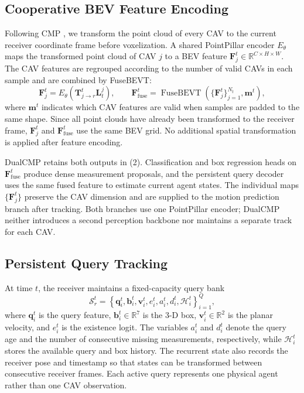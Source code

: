 \documentclass[lettersize,journal]{IEEEtran}
\begin{document}
\subsection{Cooperative BEV Feature Encoding}

Following CMP \cite{wang2025cmp}, we transform the point cloud of every CAV to the current receiver coordinate frame before voxelization. A shared PointPillar encoder \(E_\theta\) maps the transformed point cloud of CAV \(j\) to a BEV feature \(\mathbf{F}_j^t\in\mathbb{R}^{C\times H\times W}\). The CAV features are regrouped according to the number of valid CAVs in each sample and are combined by FuseBEVT:
\[
\mathbf{F}_j^t=E_\theta
\left(\mathbf{T}_{j\rightarrow r}^t\mathbf{L}_t^j\right),
\qquad
\mathbf{F}_{\mathrm{fuse}}^t=
\operatorname{FuseBEVT}
\left(\{\mathbf{F}_j^t\}_{j=1}^{N_t},\mathbf{m}^t\right),
\tag{2}
\]
where \(\mathbf{m}^t\) indicates which CAV features are valid when samples are padded to the same shape. Since all point clouds have already been transformed to the receiver frame, \(\mathbf{F}_j^t\) and \(\mathbf{F}_{\mathrm{fuse}}^t\) use the same BEV grid. No additional spatial transformation is applied after feature encoding.

DualCMP retains both outputs in (2). Classification and box regression heads on \(\mathbf{F}_{\mathrm{fuse}}^t\) produce dense measurement proposals, and the persistent query decoder uses the same fused feature to estimate current agent states. The individual maps \(\{\mathbf{F}_j^t\}\) preserve the CAV dimension and are supplied to the motion prediction branch after tracking. Both branches use one PointPillar encoder; DualCMP neither introduces a second perception backbone nor maintains a separate track for each CAV.

\subsection{Persistent Query Tracking}

At time \(t\), the receiver maintains a fixed-capacity query bank
\[
\mathcal{S}_r^t=
\left\{
\mathbf{q}_i^t,\mathbf{b}_i^t,\mathbf{v}_i^t,
e_i^t,a_i^t,d_i^t,\mathcal{H}_i^t
\right\}_{i=1}^{Q},
\tag{3}
\]
where \(\mathbf{q}_i^t\) is the query feature, \(\mathbf{b}_i^t\in\mathbb{R}^{7}\) is the 3-D box, \(\mathbf{v}_i^t\in\mathbb{R}^{2}\) is the planar velocity, and \(e_i^t\) is the existence logit. The variables \(a_i^t\) and \(d_i^t\) denote the query age and the number of consecutive missing measurements, respectively, while \(\mathcal{H}_i^t\) stores the available query and box history. The recurrent state also records the receiver pose and timestamp so that states can be transformed between consecutive receiver frames. Each active query represents one physical agent rather than one CAV observation.
\end{document}
